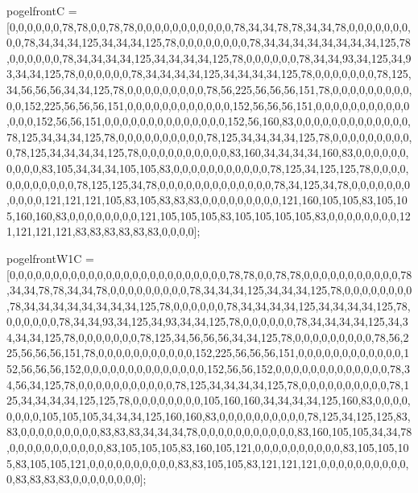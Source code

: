 pogelfrontC = [0,0,0,0,0,0,78,78,0,0,78,78,0,0,0,0,0,0,0,0,0,0,0,78,34,34,78,78,34,34,78,0,0,0,0,0,0,0,0,0,78,34,34,34,125,34,34,34,125,78,0,0,0,0,0,0,0,0,78,34,34,34,34,34,34,34,34,125,78,0,0,0,0,0,0,78,34,34,34,34,125,34,34,34,34,125,78,0,0,0,0,0,0,78,34,34,93,34,125,34,93,34,34,125,78,0,0,0,0,0,0,78,34,34,34,34,125,34,34,34,34,125,78,0,0,0,0,0,0,0,78,125,34,56,56,56,34,34,125,78,0,0,0,0,0,0,0,0,0,78,56,225,56,56,56,151,78,0,0,0,0,0,0,0,0,0,0,0,152,225,56,56,56,151,0,0,0,0,0,0,0,0,0,0,0,0,152,56,56,56,151,0,0,0,0,0,0,0,0,0,0,0,0,0,0,152,56,56,151,0,0,0,0,0,0,0,0,0,0,0,0,0,0,152,56,160,83,0,0,0,0,0,0,0,0,0,0,0,0,0,78,125,34,34,34,125,78,0,0,0,0,0,0,0,0,0,0,78,125,34,34,34,34,125,78,0,0,0,0,0,0,0,0,0,0,78,125,34,34,34,34,125,78,0,0,0,0,0,0,0,0,0,0,83,160,34,34,34,34,160,83,0,0,0,0,0,0,0,0,0,0,83,105,34,34,34,105,105,83,0,0,0,0,0,0,0,0,0,0,0,78,125,34,125,125,78,0,0,0,0,0,0,0,0,0,0,0,0,78,125,125,34,78,0,0,0,0,0,0,0,0,0,0,0,0,0,78,34,125,34,78,0,0,0,0,0,0,0,0,0,0,0,121,121,121,105,83,105,83,83,83,0,0,0,0,0,0,0,0,0,121,160,105,105,83,105,105,160,160,83,0,0,0,0,0,0,0,0,121,105,105,105,83,105,105,105,105,83,0,0,0,0,0,0,0,0,121,121,121,121,83,83,83,83,83,83,0,0,0,0];

pogelfrontW1C = [0,0,0,0,0,0,0,0,0,0,0,0,0,0,0,0,0,0,0,0,0,0,0,0,0,78,78,0,0,78,78,0,0,0,0,0,0,0,0,0,0,0,78,34,34,78,78,34,34,78,0,0,0,0,0,0,0,0,0,78,34,34,34,125,34,34,34,125,78,0,0,0,0,0,0,0,0,78,34,34,34,34,34,34,34,34,125,78,0,0,0,0,0,0,78,34,34,34,34,125,34,34,34,34,125,78,0,0,0,0,0,0,78,34,34,93,34,125,34,93,34,34,125,78,0,0,0,0,0,0,78,34,34,34,34,125,34,34,34,34,125,78,0,0,0,0,0,0,0,78,125,34,56,56,56,34,34,125,78,0,0,0,0,0,0,0,0,0,78,56,225,56,56,56,151,78,0,0,0,0,0,0,0,0,0,0,0,152,225,56,56,56,151,0,0,0,0,0,0,0,0,0,0,0,0,152,56,56,56,152,0,0,0,0,0,0,0,0,0,0,0,0,0,0,152,56,56,152,0,0,0,0,0,0,0,0,0,0,0,0,0,78,34,56,34,125,78,0,0,0,0,0,0,0,0,0,0,0,78,125,34,34,34,34,125,78,0,0,0,0,0,0,0,0,0,0,78,125,34,34,34,34,125,125,78,0,0,0,0,0,0,0,0,105,160,160,34,34,34,34,125,160,83,0,0,0,0,0,0,0,0,105,105,105,34,34,34,125,160,160,83,0,0,0,0,0,0,0,0,0,0,78,125,34,125,125,83,83,0,0,0,0,0,0,0,0,0,83,83,83,34,34,34,78,0,0,0,0,0,0,0,0,0,0,0,83,160,105,105,34,34,78,0,0,0,0,0,0,0,0,0,0,0,83,105,105,105,83,160,105,121,0,0,0,0,0,0,0,0,0,0,83,105,105,105,83,105,105,121,0,0,0,0,0,0,0,0,0,0,83,83,105,105,83,121,121,121,0,0,0,0,0,0,0,0,0,0,0,83,83,83,83,0,0,0,0,0,0,0,0];

